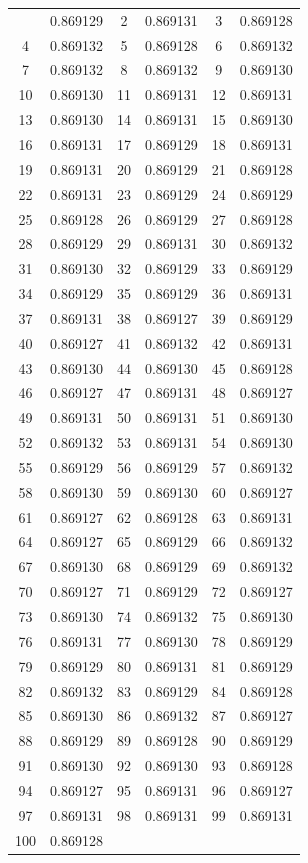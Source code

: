 \documentclass[12pt]{article}
\begin{document}
\begin{longtable}{@{}cc|cc|cc@{}}
\bottomrule
\endlastfoot
1 & 0.869129 & 2 & 0.869131 & 3 & 0.869128 \\
4 & 0.869132 & 5 & 0.869128 & 6 & 0.869132 \\
7 & 0.869132 & 8 & 0.869132 & 9 & 0.869130 \\
10 & 0.869130 & 11 & 0.869131 & 12 & 0.869131 \\
13 & 0.869130 & 14 & 0.869131 & 15 & 0.869130 \\
16 & 0.869131 & 17 & 0.869129 & 18 & 0.869131 \\
19 & 0.869131 & 20 & 0.869129 & 21 & 0.869128 \\
22 & 0.869131 & 23 & 0.869129 & 24 & 0.869129 \\
25 & 0.869128 & 26 & 0.869129 & 27 & 0.869128 \\
28 & 0.869129 & 29 & 0.869131 & 30 & 0.869132 \\
31 & 0.869130 & 32 & 0.869129 & 33 & 0.869129 \\
34 & 0.869129 & 35 & 0.869129 & 36 & 0.869131 \\
37 & 0.869131 & 38 & 0.869127 & 39 & 0.869129 \\
40 & 0.869127 & 41 & 0.869132 & 42 & 0.869131 \\
43 & 0.869130 & 44 & 0.869130 & 45 & 0.869128 \\
46 & 0.869127 & 47 & 0.869131 & 48 & 0.869127 \\
49 & 0.869131 & 50 & 0.869131 & 51 & 0.869130 \\
52 & 0.869132 & 53 & 0.869131 & 54 & 0.869130 \\
55 & 0.869129 & 56 & 0.869129 & 57 & 0.869132 \\
58 & 0.869130 & 59 & 0.869130 & 60 & 0.869127 \\
61 & 0.869127 & 62 & 0.869128 & 63 & 0.869131 \\
64 & 0.869127 & 65 & 0.869129 & 66 & 0.869132 \\
67 & 0.869130 & 68 & 0.869129 & 69 & 0.869132 \\
70 & 0.869127 & 71 & 0.869129 & 72 & 0.869127 \\
73 & 0.869130 & 74 & 0.869132 & 75 & 0.869130 \\
76 & 0.869131 & 77 & 0.869130 & 78 & 0.869129 \\
79 & 0.869129 & 80 & 0.869131 & 81 & 0.869129 \\
82 & 0.869132 & 83 & 0.869129 & 84 & 0.869128 \\
85 & 0.869130 & 86 & 0.869132 & 87 & 0.869127 \\
88 & 0.869129 & 89 & 0.869128 & 90 & 0.869129 \\
91 & 0.869130 & 92 & 0.869130 & 93 & 0.869128 \\
94 & 0.869127 & 95 & 0.869131 & 96 & 0.869127 \\
97 & 0.869131 & 98 & 0.869131 & 99 & 0.869131 \\
100 & 0.869128 &  &  &  &  \\

\end{longtable}
\end{document}
